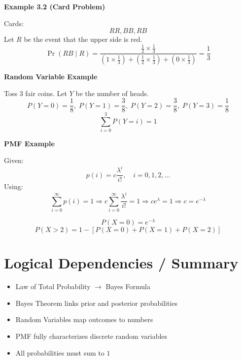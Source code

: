 \documentclass[12pt]{article}
\begin{document}
\textbf{Example 3.2 (Card Problem)}

Cards:
\[
RR, BB, RB
\]
Let $R$ be the event that the upper side is red.
\[
\Pr(RB \mid R) =
\frac{\frac{1}{2} \times \frac{1}{3}}
{(1 \times \frac{1}{3}) + (\frac{1}{2} \times \frac{1}{3}) + (0 \times \frac{1}{3})}
= \frac{1}{3}
\]

\textbf{Random Variable Example}

Toss 3 fair coins. Let $Y$ be the number of heads.
\[
P(Y=0)=\frac{1}{8}, \;
P(Y=1)=\frac{3}{8}, \;
P(Y=2)=\frac{3}{8}, \;
P(Y=3)=\frac{1}{8}
\]
\[
\sum_{i=0}^3 P(Y=i) = 1
\]

\textbf{PMF Example}

Given:
\[
p(i) = c \frac{\lambda^i}{i!}, \quad i = 0,1,2,\dots
\]
Using:
\[
\sum_{i=0}^\infty p(i) = 1
\Rightarrow
c \sum_{i=0}^\infty \frac{\lambda^i}{i!} = 1
\Rightarrow
c e^\lambda = 1
\Rightarrow
c = e^{-\lambda}
\]

\[
P(X=0) = e^{-\lambda}
\]
\[
P(X>2) = 1 - [P(X=0) + P(X=1) + P(X=2)]
\]

\section{Logical Dependencies / Summary}
\begin{itemize}[noitemsep]
\item Law of Total Probability $\rightarrow$ Bayes Formula
\item Bayes Theorem links prior and posterior probabilities
\item Random Variables map outcomes to numbers
\item PMF fully characterizes discrete random variables
\item All probabilities must sum to $1$
\end{itemize}
\end{document}
